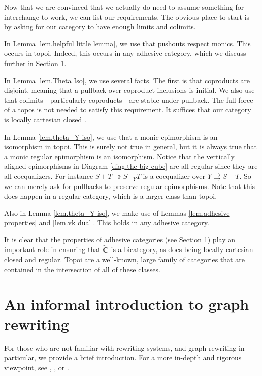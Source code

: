 \documentclass{tac}
\newcommand{\csC}{\widetilde{\mathbf{C}}}
\begin{document}
Now that we are convinced that we actually do need to assume 
something for interchange to work, we can list our requirements.  
The obvious place to start is by asking for our category to have 
enough limits and colimits.  

In Lemma 
	\ref{lem.helpful little lemma}, 
we use that pushouts respect monics.  
This occurs in topoi. Indeed, this occurs in any
adhesive category, which we discuss further in Section 
	\ref{sec.Rewriting}.  

In Lemma 
	\ref{lem.Theta Iso}, 
we use several facts.  The first is that coproducts are disjoint, 
meaning that a pullback over coproduct inclusions is initial. 
We also use that colimits---particularly coproducts---are stable under pullback.  
The full force of a topos is not needed to satisfy this requirement.  
It suffices that our category is locally cartesian closed
	\cite[Thm.~1.4.9]{MacLaneMoerdijk_SheavesGeomLogic}.

In Lemma 
	\ref{lem.theta_Y iso}, 
we use that a monic epimorphism is an isomorphism in topoi. 
This is surely not true in general, but it is always true that a 
monic regular epimorphism is an isomorphism.  
Notice that the vertically aligned epimorphisms in Diagram 
	\eqref{diag.the big cube} 
are all regular since they are all coequalizers. For instance 
	$ S + T \twoheadrightarrow S +_Y T $ 
is a coequalizer over 
	$ Y \rightrightarrows S + T $. 
So we can merely ask for pullbacks to preserve regular epimorphisms. 
Note that this does happen in a regular category, 
which is a larger class than topoi.   

Also in Lemma 
	\ref{lem.theta_Y iso}, 
we make use of Lemmas 
	\ref{lem.adhesive properties} 
and 
	\ref{lem.vk dual}.  
This holds in any adhesive category. 

It is clear that the properties of adhesive categories 
(see Section \ref{sec.Rewriting})
play an important role in ensuring that $\csC$ is a bicategory, 
as does being locally cartesian closed and regular.  
Topoi are a well-known, large family of categories 
that are contained in the intersection of all of these classes. 


\section{An informal introduction to graph rewriting}
\label{sec.Rewriting}

For those who are not familiar with rewriting systems, 
and graph rewriting in particular, 
we provide a brief introduction. 
For a more in-depth and rigorous viewpoint, see 
	\cite{Baader_TermRewritingAllThat}, 
	\cite{Ehrig_GraphGramAlgAp}, or 
	\cite{LackSoboc_AdhesiveCategories}.
\end{document}
